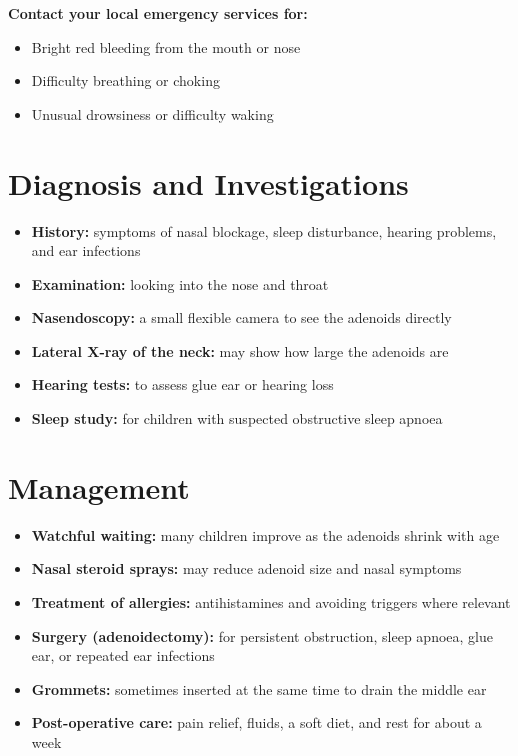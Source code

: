 \textbf{Contact your local emergency services for:}
\begin{itemize}
    \item Bright red bleeding from the mouth or nose
    \item Difficulty breathing or choking
    \item Unusual drowsiness or difficulty waking
\end{itemize}

\section*{Diagnosis and Investigations}
\begin{itemize}
    \item \textbf{History:} symptoms of nasal blockage, sleep disturbance, hearing problems, and ear infections
    \item \textbf{Examination:} looking into the nose and throat
    \item \textbf{Nasendoscopy:} a small flexible camera to see the adenoids directly
    \item \textbf{Lateral X-ray of the neck:} may show how large the adenoids are
    \item \textbf{Hearing tests:} to assess glue ear or hearing loss
    \item \textbf{Sleep study:} for children with suspected obstructive sleep apnoea
\end{itemize}

\section*{Management}
\begin{itemize}
    \item \textbf{Watchful waiting:} many children improve as the adenoids shrink with age
    \item \textbf{Nasal steroid sprays:} may reduce adenoid size and nasal symptoms
    \item \textbf{Treatment of allergies:} antihistamines and avoiding triggers where relevant
    \item \textbf{Surgery (adenoidectomy):} for persistent obstruction, sleep apnoea, glue ear, or repeated ear infections
    \item \textbf{Grommets:} sometimes inserted at the same time to drain the middle ear
    \item \textbf{Post-operative care:} pain relief, fluids, a soft diet, and rest for about a week
\end{itemize}

